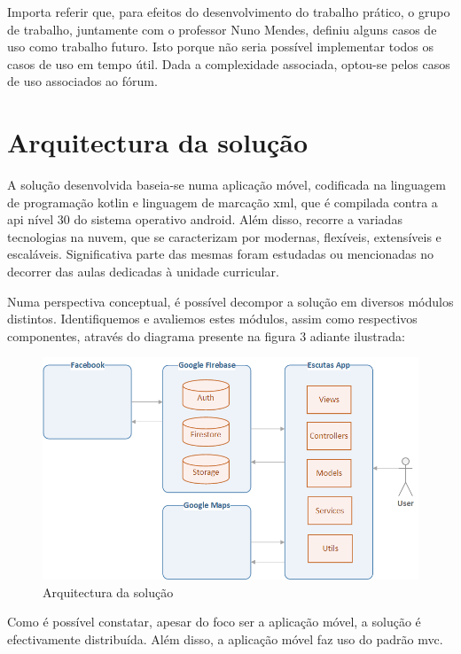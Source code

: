 \documentclass[12pt]{report}
\begin{document}
Importa referir que, para efeitos do desenvolvimento do trabalho prático, o grupo de trabalho, juntamente com o professor Nuno Mendes, definiu alguns casos de uso como trabalho futuro. Isto porque não seria possível implementar todos os casos de uso em tempo útil. Dada a complexidade associada, optou-se pelos casos de uso associados ao fórum.

\clearpage

\section{Arquitectura da solução}

A solução desenvolvida baseia-se numa aplicação móvel, codificada na linguagem de programação \gls{kotlin} e linguagem de marcação \gls{xml}, que é compilada contra a \gls{api} nível 30 do sistema operativo \gls{android}. Além disso, recorre a variadas tecnologias na nuvem, que se caracterizam por modernas, flexíveis, extensíveis e escaláveis. Significativa parte das mesmas foram estudadas ou mencionadas no decorrer das aulas dedicadas à unidade curricular.

Numa perspectiva conceptual, é possível decompor a solução em diversos módulos distintos. Identifiquemos e avaliemos estes módulos, assim como respectivos componentes, através do diagrama presente na figura 3 adiante ilustrada:

\bigskip
\begin{figure}[H]
    \centering
    \includegraphics[width=1\textwidth]{architecture.png}
    \caption{Arquitectura da solução}
\end{figure}

Como é possível constatar, apesar do foco ser a aplicação móvel, a solução é efectivamente distribuída. Além disso, a aplicação móvel faz uso do padrão \gls{mvc}.
\end{document}
